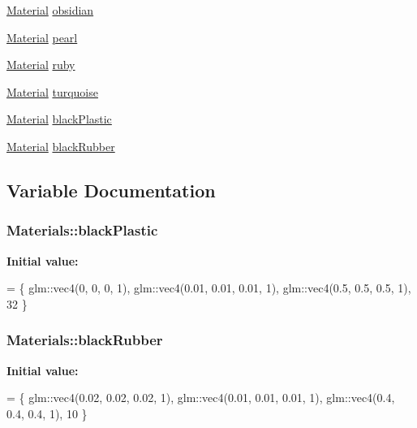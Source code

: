 \begin{DoxyCompactItemize}
\item 
\hyperlink{struct_material}{Material} \hyperlink{namespace_materials_ac8f37f7d2fdb484dee3ceab10190ba5f}{obsidian}
\item 
\hyperlink{struct_material}{Material} \hyperlink{namespace_materials_a3b1f30a53ed581645b32a371a3f18518}{pearl}
\item 
\hyperlink{struct_material}{Material} \hyperlink{namespace_materials_a0440cdfea64816f17c8616a5bbf626e2}{ruby}
\item 
\hyperlink{struct_material}{Material} \hyperlink{namespace_materials_ab5b494a26565e795963d6b448cb62516}{turquoise}
\item 
\hyperlink{struct_material}{Material} \hyperlink{namespace_materials_a8676bb061fa114ca6cde5b899d1d6b71}{black\+Plastic}
\item 
\hyperlink{struct_material}{Material} \hyperlink{namespace_materials_af18248a1ab616cf0a0c3cc026a3a7231}{black\+Rubber}
\end{DoxyCompactItemize}


\subsection{Variable Documentation}
\subsubsection[{\texorpdfstring{black\+Plastic}{blackPlastic}}]{ Materials\+::black\+Plastic}\hypertarget{namespace_materials_a8676bb061fa114ca6cde5b899d1d6b71}{}\label{namespace_materials_a8676bb061fa114ca6cde5b899d1d6b71}
{\bfseries Initial value\+:}
\begin{DoxyCode}
= \{
        glm::vec4(0, 0, 0, 1),
        glm::vec4(0.01, 0.01, 0.01, 1),
        glm::vec4(0.5, 0.5, 0.5, 1),
        32
    \}
\end{DoxyCode}
\subsubsection[{\texorpdfstring{black\+Rubber}{blackRubber}}]{ Materials\+::black\+Rubber}\hypertarget{namespace_materials_af18248a1ab616cf0a0c3cc026a3a7231}{}\label{namespace_materials_af18248a1ab616cf0a0c3cc026a3a7231}
{\bfseries Initial value\+:}
\begin{DoxyCode}
= \{
        glm::vec4(0.02, 0.02, 0.02, 1),
        glm::vec4(0.01, 0.01, 0.01, 1),
        glm::vec4(0.4, 0.4, 0.4, 1),
        10
    \}
\end{DoxyCode}
